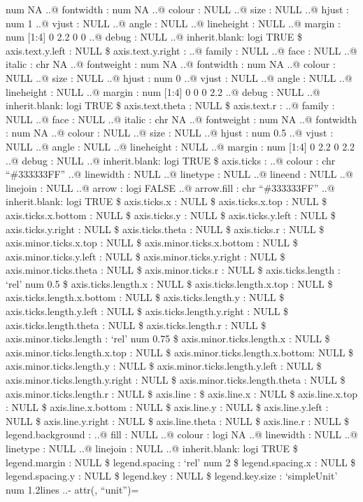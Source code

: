 \documentclass[
]{article}
\begin{document}
{num NA ..@ fontwidth : num NA ..@ colour : NULL ..@ size : NULL ..@
hjust : num 1 ..@ vjust : NULL ..@ angle : NULL ..@ lineheight : NULL
..@ margin : num {[}1:4{]} 0 2.2 0 0 ..@ debug : NULL ..@ inherit.blank:
logi TRUE \$ axis.text.y.left : NULL \$ axis.text.y.right : ..@ family :
NULL ..@ face : NULL ..@ italic : chr NA ..@ fontweight : num NA ..@
fontwidth : num NA ..@ colour : NULL ..@ size : NULL ..@ hjust : num 0
..@ vjust : NULL ..@ angle : NULL ..@ lineheight : NULL ..@ margin : num
{[}1:4{]} 0 0 0 2.2 ..@ debug : NULL ..@ inherit.blank: logi TRUE \$
axis.text.theta : NULL \$ axis.text.r : ..@ family : NULL ..@ face :
NULL ..@ italic : chr NA ..@ fontweight : num NA ..@ fontwidth : num NA
..@ colour : NULL ..@ size : NULL ..@ hjust : num 0.5 ..@ vjust : NULL
..@ angle : NULL ..@ lineheight : NULL ..@ margin : num {[}1:4{]} 0 2.2
0 2.2 ..@ debug : NULL ..@ inherit.blank: logi TRUE \$ axis.ticks : ..@
colour : chr ``\#333333FF'' ..@ linewidth : NULL ..@ linetype : NULL ..@
lineend : NULL ..@ linejoin : NULL ..@ arrow : logi FALSE ..@ arrow.fill
: chr ``\#333333FF'' ..@ inherit.blank: logi TRUE \$ axis.ticks.x : NULL
\$ axis.ticks.x.top : NULL \$ axis.ticks.x.bottom : NULL \$ axis.ticks.y
: NULL \$ axis.ticks.y.left : NULL \$ axis.ticks.y.right : NULL \$
axis.ticks.theta : NULL \$ axis.ticks.r : NULL \$ axis.minor.ticks.x.top
: NULL \$ axis.minor.ticks.x.bottom : NULL \$ axis.minor.ticks.y.left :
NULL \$ axis.minor.ticks.y.right : NULL \$ axis.minor.ticks.theta : NULL
\$ axis.minor.ticks.r : NULL \$ axis.ticks.length : `rel' num 0.5 \$
axis.ticks.length.x : NULL \$ axis.ticks.length.x.top : NULL \$
axis.ticks.length.x.bottom : NULL \$ axis.ticks.length.y : NULL \$
axis.ticks.length.y.left : NULL \$ axis.ticks.length.y.right : NULL \$
axis.ticks.length.theta : NULL \$ axis.ticks.length.r : NULL \$
axis.minor.ticks.length : `rel' num 0.75 \$ axis.minor.ticks.length.x :
NULL \$ axis.minor.ticks.length.x.top : NULL \$
axis.minor.ticks.length.x.bottom: NULL \$ axis.minor.ticks.length.y :
NULL \$ axis.minor.ticks.length.y.left : NULL \$
axis.minor.ticks.length.y.right : NULL \$ axis.minor.ticks.length.theta
: NULL \$ axis.minor.ticks.length.r : NULL \$ axis.line : \$ axis.line.x
: NULL \$ axis.line.x.top : NULL \$ axis.line.x.bottom : NULL \$
axis.line.y : NULL \$ axis.line.y.left : NULL \$ axis.line.y.right :
NULL \$ axis.line.theta : NULL \$ axis.line.r : NULL \$
legend.background : ..@ fill : NULL ..@ colour : logi NA ..@ linewidth :
NULL ..@ linetype : NULL ..@ linejoin : NULL ..@ inherit.blank: logi
TRUE \$ legend.margin : NULL \$ legend.spacing : `rel' num 2 \$
legend.spacing.x : NULL \$ legend.spacing.y : NULL \$ legend.key : NULL
\$ legend.key.size : `simpleUnit' num 1.2lines ..- attr(}, ``unit'')=
\end{document}
